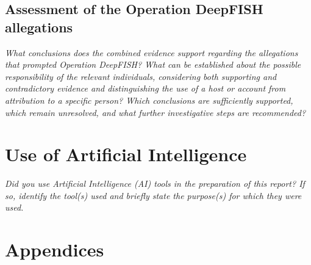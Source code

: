 \documentclass[11pt,a4paper,final,oneside]{article}
\begin{document}
\subsection{Assessment of the Operation DeepFISH allegations}

\textit{What conclusions does the combined evidence support regarding the allegations that prompted Operation DeepFISH? What can be established about the possible responsibility of the relevant individuals, considering both supporting and contradictory evidence and distinguishing the use of a host or account from attribution to a specific person? Which conclusions are sufficiently supported, which remain unresolved, and what further investigative steps are recommended?}


\section{Use of Artificial Intelligence}
\label{sec:ai}

\textit{Did you use Artificial Intelligence (AI) tools in the preparation of this report? If so, identify the tool(s) used and briefly state the purpose(s) for which they were used.}


\section{Appendices}
\label{sec:appendices}

\end{document}
